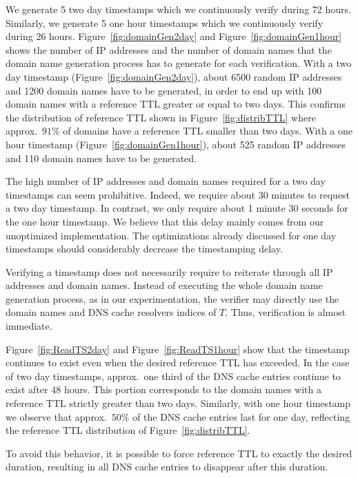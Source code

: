We generate 5 two day timestamps which we continuously verify during 72 hours. Similarly, we generate 5 one hour timestamps which we continuously verify during 26 hours.
Figure~\ref{fig:domainGen2day} and  Figure~\ref{fig:domainGen1hour} shows the number of IP addresses and the number of domain names that the domain name generation process has to generate for each verification. 
With a two day timestamp (Figure~\ref{fig:domainGen2day}), about 6500 random IP addresses and 1200 domain names have to be generated, in order to end up with 100 domain names with a reference TTL greater or equal to two days. This confirms the distribution of reference TTL shown in Figure~\ref{fig:distribTTL} where approx.\ $91\%$ of domains have a reference TTL smaller than two days. With a one hour timestamp (Figure~\ref{fig:domainGen1hour}), about 525 random IP addresses and 110 domain names have to be generated.

The high number of IP addresses and domain names required for a two day timestamps can seem prohibitive. Indeed, we require about 30 minutes to request a two day timestamp. In contrast, we only require about 1 minute 30 seconds for the one hour timestamp. We believe that this delay mainly comes from our unoptimized implementation. The optimizations already discussed for one day timestamps should considerably decrease the timestamping delay.

Verifying a timestamp does not necessarily require to reiterate through all IP addresses and domain names.
Instead of executing the whole domain name generation process, as in our experimentation, the verifier may directly use the domain names and DNS cache resolvers indices of $T$. Thus, verification is almost immediate.

Figure~\ref{fig:ReadTS2day} and Figure~\ref{fig:ReadTS1hour} show that the timestamp continues to exist even when the desired reference TTL has exceeded. In the case of two day timestamps, approx.\ one third of the DNS cache entries continue to exist after 48 hours. This portion corresponds to the domain names with a reference TTL strictly greater than two days. Similarly, with one hour timestamp we observe that approx.\ $50\%$ of the DNS cache entries last for one day, reflecting the reference TTL distribution of Figure~\ref{fig:distribTTL}.

To avoid this behavior, it is possible to force reference TTL to exactly the desired duration, resulting in all DNS cache entries to disappear after this duration.


